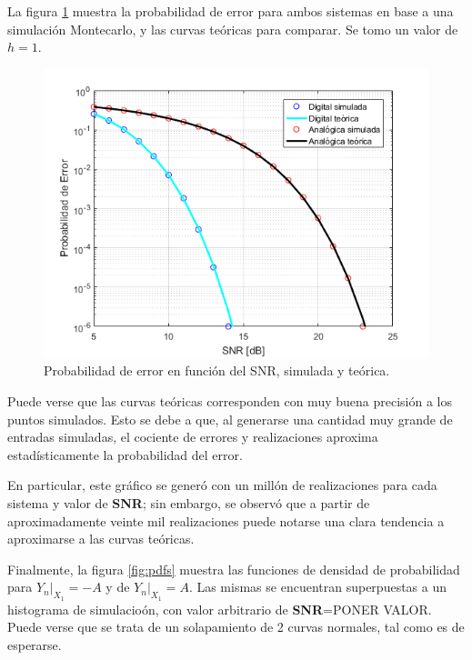 La figura \ref{fig:mc_h1} muestra la probabilidad de error para ambos sistemas en base a una simulación Montecarlo, y las curvas teóricas para comparar. Se tomo un valor de $h=1$.

\begin{figure}[H]
    \centering
    \includegraphics[width=\textwidth]{./Matlab/ej4h=1n=1meg.png}
    \caption{Probabilidad de error en función del SNR, simulada y teórica. }
\label{fig:mc_h1}
\end{figure}

Puede verse que las curvas teóricas corresponden con muy buena precisión a los puntos simulados. Esto se debe a que, al generarse una cantidad muy grande de entradas simuladas, el cociente de errores y realizaciones aproxima estadísticamente la probabilidad del error.

En particular, este gráfico se generó con un millón de realizaciones para cada sistema y valor de \textbf{SNR}; sin embargo, se observó que a partir de aproximadamente veinte mil realizaciones puede notarse una clara tendencia a aproximarse a las curvas teóricas. 

Finalmente, la figura \ref{fig:pdfs} muestra las funciones de densidad de probabilidad para $Y_n|_X_1=-A$ y de $Y_n|_X_1=A$. Las mismas se encuentran superpuestas a un histograma de simulacioón, con valor arbitrario de \textbf{SNR}=PONER VALOR. Puede verse que se trata de un solapamiento de 2 curvas normales, tal como es de esperarse.